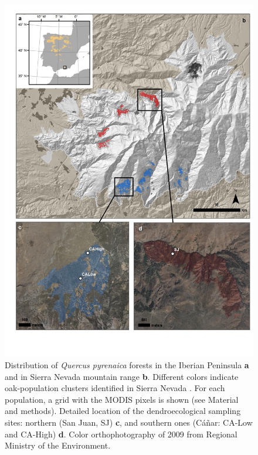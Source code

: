 \begin{figure}
\centering
\includegraphics[width=\textwidth]{img/dendro/dendro-mapa.jpg} \caption{Distribution of \textit{Quercus pyrenaica} forests in the Iberian Peninsula \textbf{a} and in Sierra Nevada mountain range \textbf{b}. Different colors indicate oak-population clusters identified in Sierra Nevada \autocite{PerezLuque2015}. For each population, a grid with the MODIS pixels is shown (see Material and methods). Detailed location of the dendroecological sampling sites: northern (San Juan, SJ) \textbf{c}, and southern ones (Cáñar: CA-Low and CA-High) \textbf{d}. Color orthophotography of 2009 from Regional Ministry of the Environment.}
\label{fig:map}
\end{figure}

